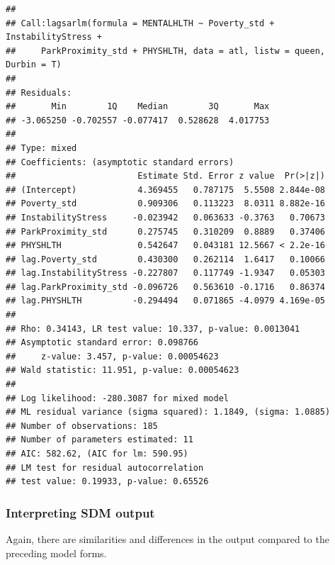 \documentclass[
]{book}
\begin{document}
\begin{verbatim}
## 
## Call:lagsarlm(formula = MENTALHLTH ~ Poverty_std + InstabilityStress + 
##     ParkProximity_std + PHYSHLTH, data = atl, listw = queen,     Durbin = T)
## 
## Residuals:
##       Min        1Q    Median        3Q       Max 
## -3.065250 -0.702557 -0.077417  0.528628  4.017753 
## 
## Type: mixed 
## Coefficients: (asymptotic standard errors) 
##                        Estimate Std. Error z value  Pr(>|z|)
## (Intercept)            4.369455   0.787175  5.5508 2.844e-08
## Poverty_std            0.909306   0.113223  8.0311 8.882e-16
## InstabilityStress     -0.023942   0.063633 -0.3763   0.70673
## ParkProximity_std      0.275745   0.310209  0.8889   0.37406
## PHYSHLTH               0.542647   0.043181 12.5667 < 2.2e-16
## lag.Poverty_std        0.430300   0.262114  1.6417   0.10066
## lag.InstabilityStress -0.227807   0.117749 -1.9347   0.05303
## lag.ParkProximity_std -0.096726   0.563610 -0.1716   0.86374
## lag.PHYSHLTH          -0.294494   0.071865 -4.0979 4.169e-05
## 
## Rho: 0.34143, LR test value: 10.337, p-value: 0.0013041
## Asymptotic standard error: 0.098766
##     z-value: 3.457, p-value: 0.00054623
## Wald statistic: 11.951, p-value: 0.00054623
## 
## Log likelihood: -280.3087 for mixed model
## ML residual variance (sigma squared): 1.1849, (sigma: 1.0885)
## Number of observations: 185 
## Number of parameters estimated: 11 
## AIC: 582.62, (AIC for lm: 590.95)
## LM test for residual autocorrelation
## test value: 0.19933, p-value: 0.65526
\end{verbatim}

\hypertarget{interpreting-sdm-output}{%
\subsubsection{Interpreting SDM output}\label{interpreting-sdm-output}}

Again, there are similarities and differences in the output compared to the preceding model forms.
\end{document}
